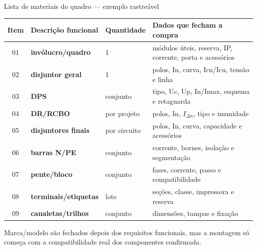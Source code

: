 \begin{frame}{Lista de materiais do quadro — exemplo rastreável}
\scriptsize
\begin{tabularx}{\textwidth}{c >{\bfseries}p{3.2cm}p{2.1cm}X}
\toprule
Item & Descrição funcional & Quantidade & Dados que fecham a compra \\
\midrule
01 & invólucro/quadro & 1 & módulos úteis, reserva, IP, corrente, porta e acessórios \\
02 & disjuntor geral & 1 & polos, In, curva, Icn/Icu, tensão e linha \\
03 & DPS & conjunto & tipo, Uc, Up, In/Imax, esquema e retaguarda \\
04 & DR/RCBO & por projeto & polos, In, $I_{\Delta n}$, tipo e imunidade \\
05 & disjuntores finais & por circuito & polos, In, curva, capacidade e acessórios \\
06 & barras N/PE & conjunto & corrente, bornes, isolação e segmentação \\
07 & pente/bloco & conjunto & fases, corrente, passo e compatibilidade \\
08 & terminais/etiquetas & lote & seções, classe, impressora e reserva \\
09 & canaletas/trilhos & conjunto & dimensões, tampas e fixação \\
\bottomrule
\end{tabularx}
\begin{caixaObs}
Marca/modelo são fechados depois dos requisitos funcionais, mas a montagem só começa com a compatibilidade real dos componentes confirmada.
\end{caixaObs}
\end{frame}

